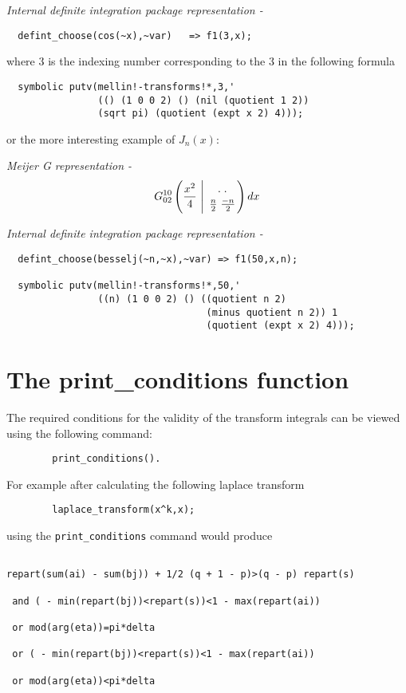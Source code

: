 \it Internal definite integration package representation  -
\begin{verbatim}
  defint_choose(cos(~x),~var)   => f1(3,x);
\end{verbatim}

\rm where 3 is the indexing number corresponding to the 3
in the following formula

\begin{verbatim}
  symbolic putv(mellin!-transforms!*,3,'
                (() (1 0 0 2) () (nil (quotient 1 2))
                (sqrt pi) (quotient (expt x 2) 4)));
\end{verbatim}

or the more interesting example of $J_{n}(x)$:

\it Meijer G representation  -
\begin{displaymath}
G^{1 0}_{0 2} \left(\frac{x^{2}}{4} \ \Bigg\vert
\ {. \; .  \atop \frac{n}{2} \; {\frac{-n}{2}}} \right) dx
\end{displaymath}

\it Internal definite integration package representation  -

\begin{verbatim}
  defint_choose(besselj(~n,~x),~var) => f1(50,x,n);

  symbolic putv(mellin!-transforms!*,50,'
                ((n) (1 0 0 2) () ((quotient n 2)
                                   (minus quotient n 2)) 1
                                   (quotient (expt x 2) 4)));
\end{verbatim}

\section{The print\_conditions function}

\rm The required conditions for the validity of the transform integrals
can be viewed using the following command:

\begin{verbatim}
        print_conditions().
\end{verbatim}

For example after calculating the following laplace transform

\begin{verbatim}
        laplace_transform(x^k,x);
\end{verbatim}

using the \verb+print_conditions+ command would produce

\begin{verbatim}

repart(sum(ai) - sum(bj)) + 1/2 (q + 1 - p)>(q - p) repart(s)

 and ( - min(repart(bj))<repart(s))<1 - max(repart(ai))

 or mod(arg(eta))=pi*delta

 or ( - min(repart(bj))<repart(s))<1 - max(repart(ai))

 or mod(arg(eta))<pi*delta

\end{verbatim}

